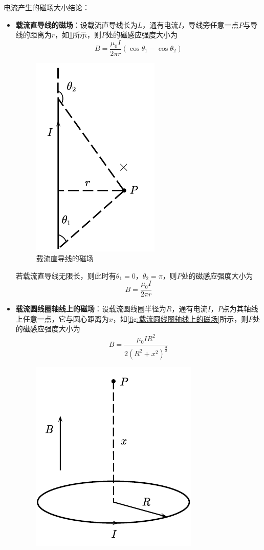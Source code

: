 \documentclass[12pt, a4paper, twoside]{ctexbook}
\begin{document}
{\sonti 电流产生的磁场大小结论}：
\begin{itemize}
    \item \textbf{载流直导线的磁场}：设载流直导线长为$L$，通有电流$I$，导线旁任意一点$P$与导线的距离为$r$，如\textcolor{blue}{\cref{fig:载流直导线的磁场}}所示，则$P$处的磁感应强度大小为
    $$
    B=\frac{\mu_0I}{2\pi r}\left(\cos\theta_1-\cos\theta_2\right)
    $$
    \begin{figure}[H]
        \centerline{\includegraphics[scale=1.0]{载流直导线的磁场.pdf}}
        \caption{载流直导线的磁场}
        \label{fig:载流直导线的磁场}
    \end{figure}
    若载流直导线无限长，则此时有$\theta_1=0$，$\theta_2=\pi$，则$P$处的磁感应强度大小为
    $$
    B=\frac{\mu_0I}{2\pi r}
    $$
    \item \textbf{载流圆线圈轴线上的磁场}：设载流圆线圈半径为$R$，通有电流$I$，$P$点为其轴线上任意一点，它与圆心距离为$x$，如\textcolor{blue}{\cref{fig:载流圆线圈轴线上的磁场}}所示，则$P$处的磁感应强度大小为
    $$
    B=\frac{\mu_0I R^2}{2\left(R^2+x^2\right)^{\frac{3}{2}}}
    $$
    \begin{figure}[H]
        \centerline{\includegraphics[scale=0.88]{载流圆线圈轴线上的磁场.pdf}}

\end{figure}
\end{itemize}
\end{document}
